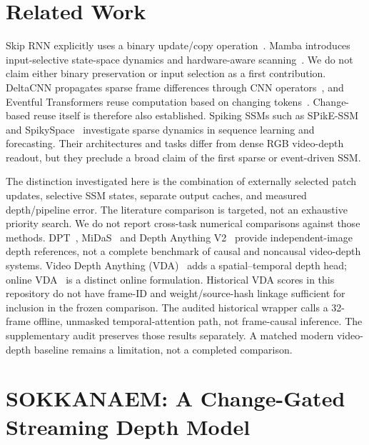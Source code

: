 \documentclass[mathematics,article,submit,moreauthors]{Definitions/mdpi}
\begin{document}
\section{Related Work}
Skip RNN explicitly uses a binary update/copy operation~\cite{campos2018}. Mamba introduces
input-selective state-space dynamics and hardware-aware scanning~\cite{gu2024}. We do not
claim either binary preservation or input selection as a first contribution.
DeltaCNN propagates sparse frame differences through CNN operators~\cite{deltacnn}, and
Eventful Transformers reuse computation based on changing tokens~\cite{eventful}.
Change-based reuse itself is therefore also established. Spiking SSMs such as
SPikE-SSM~\cite{spikessm} and SpikySpace~\cite{spikyspace} investigate sparse dynamics
in sequence learning and forecasting. Their architectures and tasks differ from dense
RGB video-depth readout, but they preclude a broad claim of the first sparse or event-driven SSM.

The distinction investigated here is the combination of externally selected patch updates,
selective SSM states, separate output caches, and measured depth/pipeline error.
The literature comparison is targeted, not an exhaustive priority search. We do not report
cross-task numerical comparisons against those methods. DPT~\cite{dpt}, MiDaS~\cite{midas}
and Depth Anything V2~\cite{da2} provide independent-image depth references, not a complete
benchmark of causal and noncausal video-depth systems.
Video Depth Anything (VDA)~\cite{vda} adds a spatial--temporal depth head;
online VDA~\cite{ovda} is a distinct online formulation. Historical VDA scores in
this repository do not have frame-ID and weight/source-hash linkage sufficient
for inclusion in the frozen comparison. The audited historical wrapper calls
a 32-frame offline, unmasked temporal-attention path, not frame-causal inference.
The supplementary audit preserves those results separately. A matched modern
video-depth baseline remains a limitation, not a completed comparison.

\section{SOKKANAEM: A Change-Gated Streaming Depth Model}
\end{document}
